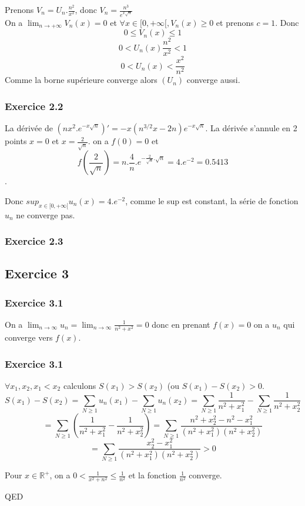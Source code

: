 \documentclass[]{book}
\theoremstyle{definition}
\newcommand{\bb}[1]{\mathbb{#1}}
\newcommand{\R}{\bb{R}}
\begin{document}
Prenons $V_n = U_n.\frac{n^2}{x^2}$, donc $V_n = \frac{n^3}{e^{x\sqrt{n}}}$\\
On a $\lim_{n \to +\infty} V_n(x) = 0$ et $\forall x \in [0,+\infty[, V_n(x) \geq 0$ et prenons $c=1$. Donc
$$0 \leq V_n(x) \leq 1$$
$$0 < U_n(x)\frac{n^2}{x^2} < 1$$
$$0 < U_n(x) < \frac{x^2}{n^2}$$
Comme la borne sup\'erieure converge alors $(U_n)$ converge aussi.


\subsubsection*{Exercice 2.2}
La d\'eriv\'ee de $\left(nx^2.e^{-x\sqrt{n}}\right)' = -x(n^{3/2}x-2n)e^{-x\sqrt{n}}$. La d\'eriv\'ee s'annule en 2 points $x=0$ et $x=\frac{2}{\sqrt{n}}$.
on a $f(0) = 0$ et 
$$f(\frac{2}{\sqrt{n}}) = n.\frac{4}{n}.e^{-\frac{2}{\sqrt{n}}.\sqrt{n}} = 4.e^{-2} = 0.5413$$. 

Donc $sup_{x\in[0,+\infty[}u_n(x) = 4.e^{-2}$, comme le sup est constant, la s\'erie de fonction $u_n$ ne converge pas.


\subsubsection*{Exercice 2.3}


\subsection*{Exercice 3}
\subsubsection*{Exercice 3.1}
On a $\lim_{n \to \infty}u_n = \lim_{n \to \infty}\frac{1}{n^2+x^2} = 0$ donc en prenant $f(x) =0$ on a $u_n$ qui converge vers $f(x)$.
 
\subsubsection*{Exercice 3.1}
$\forall x_1, x_2, x_1 < x_2$ calculons $S(x_1) > S(x_2)$ (ou $S(x_1)-S(x_2) > 0$.
$$S(x_1)-S(x_2) = \sum_{N \geq 1} u_n(x_1) - \sum_{N \geq 1} u_n(x_2) = \sum_{N \geq 1} \frac{1}{n^2+x_1^2} - \sum_{N \geq 1} \frac{1}{n^2+x_2^2}$$
$$= \sum_{N \geq 1} \left(\frac{1}{n^2+x_1^2} - \frac{1}{n^2+x_2^2}\right) = \sum_{N \geq 1}\frac{n^2+x_2^2 - n^2-x_1^2}{(n^2+x_1^2)(n^2+x_2^2)}$$ 
$$= \sum_{N \geq 1}\frac{x_2^2 - x_1^2}{(n^2+x_1^2)(n^2+x_2^2)} > 0$$


Pour $x \in \R^{+}$, on a $ 0 < \frac{1}{x^2+n^2} \leq \frac{1}{n^2}$ et la fonction $\frac{1}{n^2}$ converge.


QED
\end{document}
